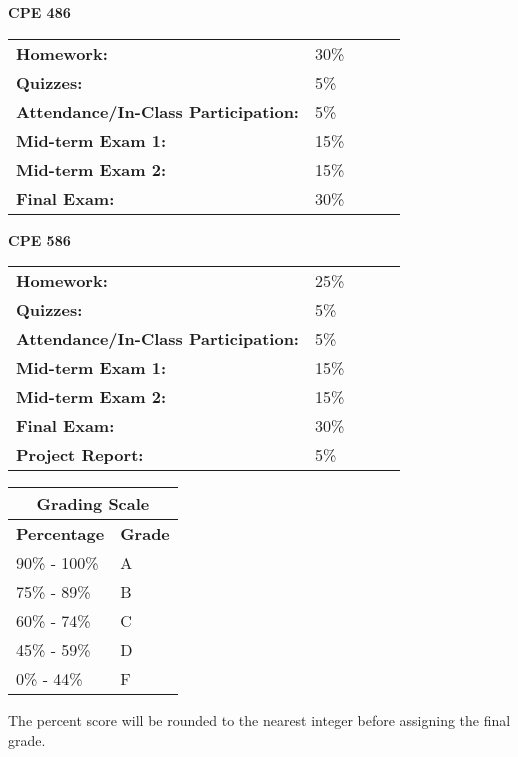 \documentclass[12pt,nohyper,nobib,xcolor=dvipsnames,svgnames,x11names]{tufte-book}
\begin{document}
\begin{center}

\textbf{CPE 486}

\begin{tabular}{lp{1in} l l l}
\textbf{Homework:} & 30\% \\
 \textbf{Quizzes:} &  5\%\\
\textbf{Attendance/In-Class Participation:} & 5\%\\
\textbf{Mid-term Exam 1:} & 15\%  \\
\textbf{Mid-term Exam 2:} & 15\%  \\
\textbf{Final Exam:} & 30\%  \\
\end{tabular}

\textbf{CPE 586}

\begin{tabular}{lp{1in} l l l}
\textbf{Homework:} & 25\% \\
 \textbf{Quizzes:} &  5\%\\
\textbf{Attendance/In-Class Participation:} & 5\%\\
\textbf{Mid-term Exam 1:} & 15\%  \\
\textbf{Mid-term Exam 2:} & 15\%  \\
\textbf{Final Exam:} & 30\%  \\
\textbf{Project Report:} & 5\%  \\

\end{tabular}

\end{center}


\begin{tabular}{|p{3cm}|p{3cm}|}
\hline
\multicolumn{2}{|c|}{\textbf{Grading Scale}} \\ \hline
\textbf{Percentage} & \textbf{Grade} \\ \hline
90\% - 100\% & A \\ \hline
75\% - 89\% & B \\ \hline
60\% - 74\% & C \\ \hline
45\% - 59\% & D \\ \hline
0\% - 44\% & F \\ \hline
\end{tabular}

The percent score will be rounded to the nearest integer before assigning the final grade.
\end{document}
